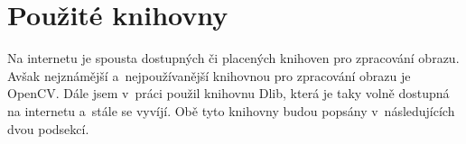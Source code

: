 \section{Použité knihovny}
Na internetu je spousta dostupných či placených knihoven pro zpracování obrazu. Avšak nejznámější a~nejpoužívanější knihovnou pro zpracování obrazu je OpenCV. Dále jsem v~práci použil knihovnu Dlib, která je taky volně dostupná na internetu a~stále se vyvíjí. Obě tyto knihovny budou popsány v~následujících dvou podsekcí.